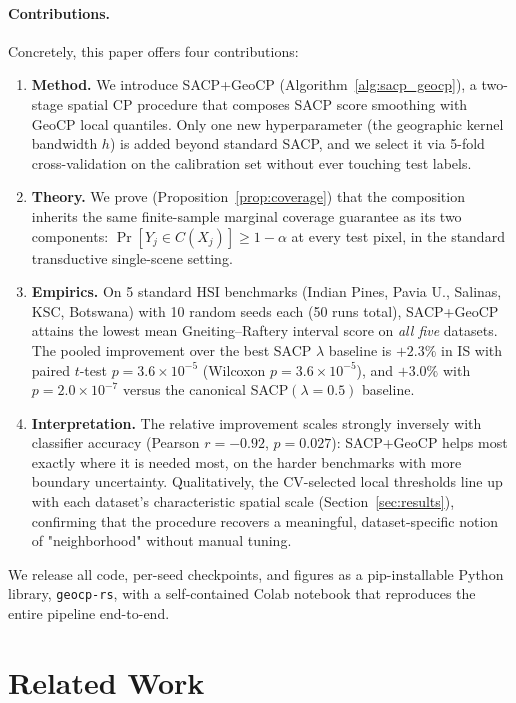 \documentclass[11pt]{article}
\newcommand{\1}{\mathbf{1}}
\begin{document}
\paragraph{Contributions.} Concretely, this paper offers four contributions:
\begin{enumerate}[topsep=2pt,itemsep=2pt,leftmargin=1.5em]
    \item \textbf{Method.} We introduce SACP+GeoCP (Algorithm~\ref{alg:sacp_geocp}), a two-stage spatial CP procedure that composes SACP score smoothing with GeoCP local quantiles. Only one new hyperparameter (the geographic kernel bandwidth $h$) is added beyond standard SACP, and we select it via 5-fold cross-validation on the calibration set without ever touching test labels.
    \item \textbf{Theory.} We prove (Proposition~\ref{prop:coverage}) that the composition inherits the same finite-sample marginal coverage guarantee as its two components: $\Pr[Y_j \in C(X_j)] \ge 1 - \alpha$ at every test pixel, in the standard transductive single-scene setting.
    \item \textbf{Empirics.} On 5 standard HSI benchmarks (Indian Pines, Pavia U., Salinas, KSC, Botswana) with 10 random seeds each (50 runs total), SACP+GeoCP attains the lowest mean Gneiting--Raftery interval score on \emph{all five} datasets. The pooled improvement over the best SACP $\lambda$ baseline is $+2.3\%$ in IS with paired $t$-test $p = 3.6\times 10^{-5}$ (Wilcoxon $p = 3.6\times 10^{-5}$), and $+3.0\%$ with $p = 2.0\times 10^{-7}$ versus the canonical SACP$(\lambda{=}0.5)$ baseline.
    \item \textbf{Interpretation.} The relative improvement scales strongly inversely with classifier accuracy (Pearson $r = -0.92$, $p = 0.027$): SACP+GeoCP helps most exactly where it is needed most, on the harder benchmarks with more boundary uncertainty. Qualitatively, the CV-selected local thresholds line up with each dataset's characteristic spatial scale (Section~\ref{sec:results}), confirming that the procedure recovers a meaningful, dataset-specific notion of "neighborhood" without manual tuning.
\end{enumerate}

We release all code, per-seed checkpoints, and figures as a pip-installable Python library, \texttt{geocp-rs}, with a self-contained Colab notebook that reproduces the entire pipeline end-to-end.

\section{Related Work}
\end{document}
